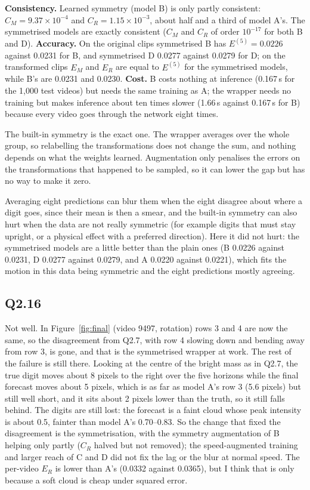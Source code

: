 \documentclass[11pt,letterpaper]{article}
\begin{document}
\textbf{Consistency.} Learned symmetry (model B) is only partly consistent: $C_M=9.37\times10^{-4}$ and
$C_R=1.15\times10^{-3}$, about half and a third of model A's. The symmetrised models are exactly consistent
($C_M$ and $C_R$ of order $10^{-17}$ for both B and D). \textbf{Accuracy.} On the original clips symmetrised B has
$E^{(5)}=0.0226$ against 0.0231 for B, and symmetrised D 0.0277 against 0.0279 for D; on the transformed clips
$E_M$ and $E_R$ are equal to $E^{(5)}$ for the symmetrised models, while B's are 0.0231 and 0.0230. \textbf{Cost.}
B costs nothing at inference (0.167\,s for the 1,000 test videos) but needs the same training as A; the wrapper
needs no training but makes inference about ten times slower (1.66\,s against 0.167\,s for B) because every video
goes through the network eight times.

The built-in symmetry is the exact one. The wrapper averages over the whole group, so relabelling the
transformations does not change the sum, and nothing depends on what the weights learned. Augmentation only
penalises the errors on the transformations that happened to be sampled, so it can lower the gap but has no way to
make it zero.

Averaging eight predictions can blur them when the eight disagree about where a digit goes, since their mean is then
a smear, and the built-in symmetry can also hurt when the data are not really symmetric (for example digits that
must stay upright, or a physical effect with a preferred direction). Here it did not hurt: the symmetrised models are
a little better than the plain ones (B 0.0226 against 0.0231, D 0.0277 against 0.0279, and A 0.0220 against 0.0221),
which fits the motion in this data being symmetric and the eight predictions mostly agreeing.

\subsection*{Q2.16}

Not well. In Figure~\ref{fig:final} (video 9497, rotation) rows 3 and 4 are now the same, so the disagreement
from Q2.7, with row 4 slowing down and bending away from row 3, is gone, and that is the symmetrised wrapper at
work. The rest of the failure is still there. Looking at the centre of the bright mass as in Q2.7, the true digit
moves about 8 pixels to the right over the five horizons while the final forecast moves about 5 pixels, which is
as far as model A's row 3 (5.6 pixels) but still well short, and it sits about 2 pixels lower than the truth, so it
still falls behind. The digits are still lost: the forecast is a faint cloud whose peak intensity is about 0.5,
fainter than model A's 0.70--0.83. So the change that fixed the disagreement is the symmetrisation, with the symmetry
augmentation of B helping only partly ($C_R$ halved but not removed); the speed-augmented training and larger reach
of C and D did not fix the lag or the blur at normal speed. The per-video $E_R$ is lower than A's (0.0332 against
0.0365), but I think that is only because a soft cloud is cheap under squared error.
\end{document}
